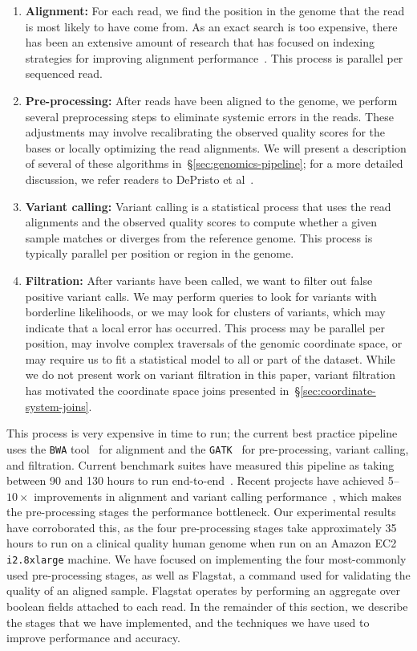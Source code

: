 \documentclass{acm_proc_article-sp}
\begin{document}
\begin{enumerate}
\item \textbf{Alignment:} For each read, we find the position in the genome that the read is most likely to
have come from. As an exact search is too expensive, there has been an extensive amount of research
that has focused on indexing strategies for improving alignment performance~\cite{li10, li11,
zaharia11}. This process is parallel per sequenced read.
\item \textbf{Pre-processing:} After reads have been aligned to the genome, we perform several
preprocessing steps to eliminate systemic errors in the reads. These adjustments may involve recalibrating the
observed quality scores for the bases or locally optimizing the read alignments. We will present a
description of several of these algorithms in~\S\ref{sec:genomics-pipeline}; for a more detailed
discussion, we refer readers to DePristo et al~\cite{depristo11}.
\item \textbf{Variant calling:} Variant calling is a statistical process that uses the read alignments
and the observed quality scores to compute whether a given sample \linebreak matches or diverges
from the reference genome. This process is typically parallel per position or region in the genome.
\item \textbf{Filtration:} After variants have been called, we want to filter out false positive variant calls.
We may perform queries to look for variants with borderline likelihoods, or we may look for clusters of
variants, which may indicate that a local error has occurred. This process may be parallel per position,
may involve complex traversals of the genomic coordinate space, or may require us to fit a statistical
model to all or part of the dataset. While we do not present work on variant filtration in this paper, variant
filtration has motivated the coordinate space joins presented in~\S\ref{sec:coordinate-system-joins}.
\end{enumerate}

This process is very expensive in time to run; the current best practice pipeline uses the \texttt{BWA} tool~\cite{li10} for
alignment and the \texttt{GATK}~\cite{depristo11, mckenna10} for pre-processing, variant calling, and filtration.
Current benchmark suites have measured this pipeline as taking between 90 and 130 hours to run
end-to-end~\cite{talwalkar14}. Recent projects have achieved 5--$10\times$ improvements in alignment
and variant calling performance~\cite{rimmer14, zaharia11}, which makes the pre-processing stages
the performance bottleneck. Our experimental results have corroborated this, as the four pre-processing stages
take approximately 35 hours to run on a clinical quality human genome when run on an Amazon EC2 \texttt{i2.8xlarge}
machine. We have focused on implementing the four most-commonly used pre-processing stages, as well as
Flagstat, a command used for validating the quality of an aligned sample. Flagstat operates by
performing an aggregate over boolean fields attached to each read. In the remainder of
this section, we describe the stages that we have implemented, and the techniques we have used to improve
performance and accuracy.
\end{document}
